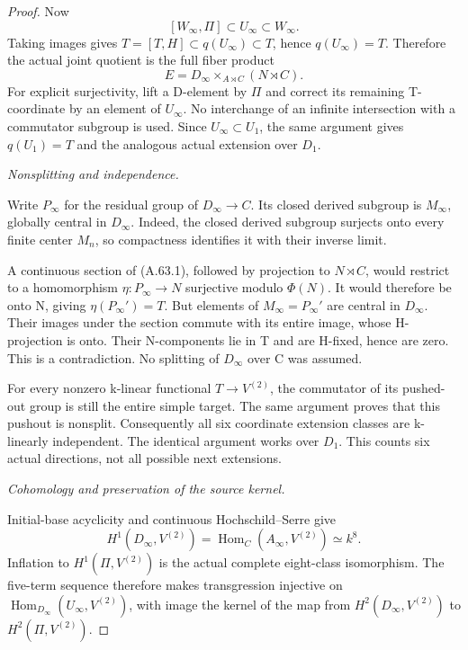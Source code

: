 \begin{proof}
Now
\[
 [W_\infty,\Pi]\subset U_\infty\subset W_\infty.
 \tag{A.63.6}
\]
Taking images gives
\(T=[T,H]\subset q(U_\infty)\subset T\), hence
\(q(U_\infty)=T\). Therefore the actual joint quotient
is the full fiber product
\[
 E=D_\infty\mathbin{\times}_{A\rtimes C}(N\rtimes C).
 \tag{A.63.7}
\]
For explicit surjectivity, lift a D-element by \(\Pi\)
and correct its remaining T-coordinate by an element
of \(U_\infty\). No interchange of an infinite
intersection with a commutator subgroup is used.
Since \(U_\infty\subset U_1\), the same argument gives
\(q(U_1)=T\) and the analogous actual extension over
\(D_1\).

\emph{Nonsplitting and independence.}\par
Write \(P_\infty\) for the residual group of
\(D_\infty\to C\). Its closed derived subgroup is
\(M_\infty\), globally central in \(D_\infty\).
Indeed, the closed derived subgroup surjects onto
every finite center \(M_n\), so compactness identifies
it with their inverse limit.

A continuous section of (A.63.1), followed by
projection to \(N\rtimes C\), would restrict to a
homomorphism \(\eta:P_\infty\to N\) surjective modulo
\(\Phi(N)\). It would therefore be onto N, giving
\(\eta(P_\infty')=T\). But elements of
\(M_\infty=P_\infty'\) are central in \(D_\infty\).
Their images under the section commute with its
entire image, whose H-projection is onto. Their
N-components lie in T and are H-fixed, hence are
zero. This is a contradiction. No splitting of
\(D_\infty\) over C was assumed.

For every nonzero k-linear functional
\(T\to V^{(2)}\), the commutator of its pushed-out
group is still the entire simple target. The same
argument proves that this pushout is nonsplit.
Consequently all six coordinate extension classes
are k-linearly independent. The identical argument
works over \(D_1\). This counts six actual directions,
not all possible next extensions.

\emph{Cohomology and preservation of the source kernel.}\par
Initial-base acyclicity and continuous
Hochschild--Serre give
\[
 H^1(D_\infty,V^{(2)})
  =\operatorname{Hom}_C(A_\infty,V^{(2)})\simeq k^8.
 \tag{A.63.8}
\]
Inflation to \(H^1(\Pi,V^{(2)})\) is the actual
complete eight-class isomorphism. The five-term
sequence therefore makes transgression injective
on \(\operatorname{Hom}_{D_\infty}(U_\infty,V^{(2)})\),
with image the kernel of the map from
\(H^2(D_\infty,V^{(2)})\) to \(H^2(\Pi,V^{(2)})\).


\end{proof}
